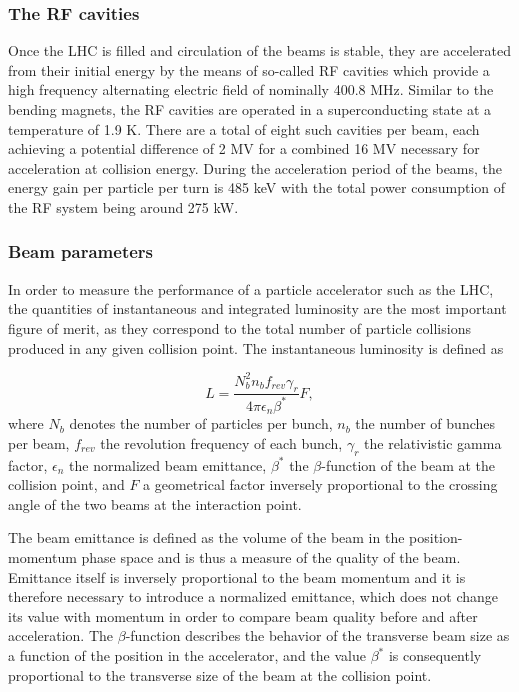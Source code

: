 \subsubsection*{The RF cavities}
Once the LHC is filled and circulation of the beams is stable, they are accelerated from their initial energy
by the means of so-called RF cavities which provide a high frequency alternating electric field of nominally
400.8 MHz. Similar to the bending magnets, the RF cavities are operated in a superconducting state at a temperature
of 1.9 K.
There are a total of eight such cavities per beam, each achieving a potential difference of 2 MV for a combined 16 MV 
necessary for acceleration at collision energy. During the acceleration period of the beams, the energy gain
per particle per turn is 485 keV with the total power consumption of the RF system being around 275 kW. 

\subsubsection*{Beam parameters}
In order to measure the performance of a particle accelerator such as the LHC, the quantities of instantaneous and integrated
luminosity are the most important figure of merit, as they correspond to the total number of particle collisions
produced in any given collision point. The instantaneous luminosity is defined as

\begin{equation}
    L = \frac{N_b^2 n_b f_{rev} \gamma_r}{4 \pi \epsilon_n \beta^*} F,
\end{equation}
where $N_b$ denotes the number of particles per bunch, $n_b$ the number of bunches per beam, $f_{rev}$ the revolution 
frequency of each bunch, $\gamma_r$ the relativistic gamma factor, $\epsilon_n$ the normalized beam emittance,
$\beta^*$ the $\beta$-function of the beam at the collision point, and $F$ a geometrical factor inversely proportional
to the crossing angle of the two beams at the interaction point. 

The beam emittance is defined as the 
volume of the beam in the position-momentum phase space and is thus a measure of the quality of the beam. Emittance itself is 
inversely proportional to the beam momentum and it is therefore necessary to introduce a normalized emittance, which does not change
its value with momentum in order to compare beam quality before and after acceleration. The $\beta$-function describes the
behavior of the transverse beam size as a function of the position in the accelerator, and the value $\beta^*$ is consequently
proportional to the transverse size of the beam at the collision point.


